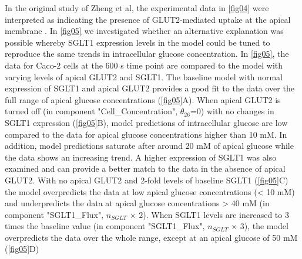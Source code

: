 \documentclass[fleqn,10pt]{physiome}
\begin{document}
In the original study of Zheng et al, the experimental data in \autoref{fig04}
were interpreted as indicating the presence of GLUT2-mediated uptake at the
apical membrane \citep{zheng2012mechanisms}. In \autoref{fig05} we investigated whether an alternative explanation
was possible whereby SGLT1 expression levels in the model could be
tuned to reproduce the same trends in intracellular glucose concentration. In
\autoref{fig05}, the data for Caco-2 cells at the 600 s time point are compared
to the model with varying levels of apical GLUT2 and SGLT1. The baseline
model with normal expression of SGLT1 and apical GLUT2 provides a good fit
to the data over the full range of apical glucose concentrations (\autoref{fig05}A). 
When apical GLUT2 is turned off (in component "Cell\_Concentration", {$\theta_{26}$}=0) with no changes in SGLT1 expression
(\autoref{fig05}B), model predictions of intracellular glucose are low compared to the
data for apical glucose concentrations higher than 10 mM. In addition, model
predictions saturate after around 20 mM of apical glucose while the data shows
an increasing trend. A higher expression of SGLT1 was also examined and can
provide a better match to the data in the absence of apical GLUT2. With
no apical GLUT2 and 2-fold levels of baseline SGLT1 (\autoref{fig05}C) the model
overpredicts the data at low apical glucose concentrations (< 10 mM) and underpredicts
the data at apical glucose concentrations > 40 mM (in component "SGLT1\_Flux", $n_{SGLT}$ $\times$ $2$). When SGLT1 levels are increased to 3 times the baseline value (in component "SGLT1\_Flux", $n_{SGLT}$ $\times$ $3$), the model overpredicts the data over the whole range, except at an apical glucose of 50 mM (\autoref{fig05}D)
\end{document}
